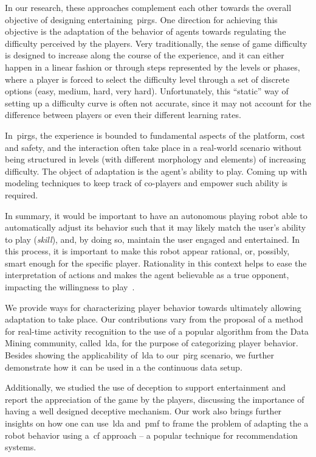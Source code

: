 In our research, these approaches complement each other towards the overall objective of designing entertaining~\glspl{pirg}. One direction for achieving this objective is the adaptation of the behavior of agents towards regulating the difficulty perceived by the players. Very traditionally, the sense of game difficulty is designed to increase along the course of the experience, and it can either happen in a linear fashion or through steps represented by the levels or phases, where a player is forced to select the difficulty level through a set of discrete options (easy, medium, hard, very hard). Unfortunately, this ``static'' way of setting up a difficulty curve is often not accurate, since it may not account for the difference between players or even their different learning rates. 

In~\glspl{pirg}, the experience is bounded to fundamental aspects of the platform, \eg cost and safety, and the interaction often take place in a real-world scenario without being structured in levels (with different morphology and elements) of increasing difficulty. The object of adaptation is the agent's ability to play. Coming up with modeling techniques to keep track of co-players and empower such ability is required.

In summary, it would be important to have an autonomous playing robot able to automatically adjust its behavior such that it may likely match the user's ability to play (\textit{skill}), and, by doing so, maintain the user engaged and entertained. In this process, it is important to make this robot appear rational, or, possibly, smart enough for the specific player. Rationality in this context helps to ease the interpretation of actions and makes the agent believable as a true opponent, impacting the willingness to play~\citep{martinoia_physically_2013, bonarini_timing_2014}. 

We provide ways for characterizing player behavior towards ultimately allowing adaptation to take place. Our contributions vary from the proposal of a method for real-time activity recognition to the use of a popular algorithm from the Data Mining community, called~\acrfull{lda}, for the purpose of categorizing player behavior. Besides showing the applicability of~\gls{lda} to our~\gls{pirg} scenario, we further demonstrate how it can be used in a the continuous data setup.

Additionally, we studied the use of deception to support entertainment and report the appreciation of the game by the players, discussing the importance of having a well designed deceptive mechanism. Our work also brings further insights on how one can use~\gls{lda} and~\gls{pmf} to frame the problem of adapting the a robot behavior using a~\gls{cf} approach -- a popular technique for recommendation systems.

